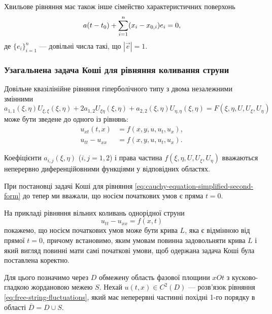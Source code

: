 Хвильове рівняння має також інше сімейство характеристичних поверхонь
\begin{equation}
    a (t - t_0) + \displaystyle\sum\limits_{i = 1}^n (x_i - x_{0,i}) e_i = 0,
\end{equation}
де $\{e_i\}_{i = 1}^n$ --- довільні числа такі, що $|\vec e| = 1$.

\subsubsection{Узагальнена задача Коші для рівняння коливання струни}

Довільне квазілінійне рівняння гіперболічного типу з двома незалежними змінними
\begin{equation}
    a_{1, 1} (\xi, \eta) U_{\xi, \xi} (\xi, \eta) + 2 a_{1, 2} U_{\xi \eta}(\xi, \eta) + a_{2, 2} (\xi, \eta) U_{\eta, \eta}(\xi, \eta) = F(\xi, \eta, U, U_\xi, U_\eta)
\end{equation}
може бути зведене до одного із рівнянь:
\begin{align}
    \label{eq:cauchy-equation-simplified-first-form}
    u_{xt}(t,x) &= f(x, y, u, u_t, u_x), \\
    \label{eq:cauchy-equation-simplified-second-form}
    u_{tt} - u_{xx} &= f(x, y, u, u_t, u_x).
\end{align}

\begin{remark}
    Коефіцієнти $a_{i,j}(\xi,\eta)$ ($i, j = 1, 2$) і права частина $f(\xi, \eta, U, U_\xi, U_\eta)$ вважаються неперервно диференційовними функціями у відповідних областях.
\end{remark}

При постановці задачі Коші для рівняння \eqref{eq:cauchy-equation-simplified-second-form} до тепер ми вважали, що носієм початкових умов є пряма $t = 0$. \medskip

На прикладі рівняння вільних коливань однорідної струни
\begin{equation}
    \label{eq:free-string-fluctuations}
    u_{tt} - u_{xx} = f(x, t)
\end{equation}
покажемо, що носієм початкових умов може бути крива $L$, яка є відмінною від прямої $t = 0$, причому встановимо, яким умовам повинна задовольняти крива $L$ і який вигляд повинні мати самі початкові умови, щоб одержана задача Коші була поставлена коректно. \medskip

Для цього позначимо через $D$ обмежену область фазової площини $xOt$ з кусково-гладкою жордановою межею $S$. Нехай $u(t, x) \in C^2(D)$ --- розв'язок рівняння \eqref{eq:free-string-fluctuations}, який має неперервні частинні похідні 1-го порядку в області $\overline{D} = D \cup S$. \medskip

